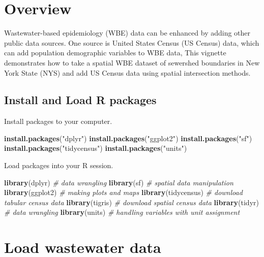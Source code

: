 \documentclass[
]{book}
\newenvironment{Shaded}{\begin{snugshade}}{\end{snugshade}}
\newcommand{\CommentTok}[1]{\textcolor[rgb]{0.56,0.35,0.01}{\textit{#1}}}
\newcommand{\FunctionTok}[1]{\textcolor[rgb]{0.13,0.29,0.53}{\textbf{#1}}}
\newcommand{\NormalTok}[1]{#1}
\newcommand{\StringTok}[1]{\textcolor[rgb]{0.31,0.60,0.02}{#1}}
\begin{document}
\section{Overview}\label{overview-1}

Wastewater-based epidemiology (WBE) data can be enhanced by adding other public data sources. One source is United States Census (US Census) data, which can add population demographic variables to WBE data, This vignette demonstrates how to take a spatial WBE dataset of sewershed boundaries in New York State (NYS) and add US Census data using spatial intersection methods.

\subsection{Install and Load R packages}\label{install-and-load-r-packages}

Install packages to your computer.

\begin{Shaded}
\begin{Highlighting}[]
\FunctionTok{install.packages}\NormalTok{(}\StringTok{"dplyr"}\NormalTok{)}
\FunctionTok{install.packages}\NormalTok{(}\StringTok{"ggplot2"}\NormalTok{)}
\FunctionTok{install.packages}\NormalTok{(}\StringTok{"sf"}\NormalTok{)}
\FunctionTok{install.packages}\NormalTok{(}\StringTok{"tidycensus"}\NormalTok{)}
\FunctionTok{install.packages}\NormalTok{(}\StringTok{"units"}\NormalTok{)}
\end{Highlighting}
\end{Shaded}

Load packages into your R session.

\begin{Shaded}
\begin{Highlighting}[]
\FunctionTok{library}\NormalTok{(dplyr) }\CommentTok{\# data wrangling}
\FunctionTok{library}\NormalTok{(sf) }\CommentTok{\# spatial data manipulation}
\FunctionTok{library}\NormalTok{(ggplot2) }\CommentTok{\# making plots and maps}
\FunctionTok{library}\NormalTok{(tidycensus) }\CommentTok{\# download tabular census data}
\FunctionTok{library}\NormalTok{(tigris) }\CommentTok{\# download spatial census data}
\FunctionTok{library}\NormalTok{(tidyr) }\CommentTok{\# data wrangling}
\FunctionTok{library}\NormalTok{(units) }\CommentTok{\# handling variables with unit assignment}
\end{Highlighting}
\end{Shaded}

\section{Load wastewater data}\label{load-wastewater-data}
\end{document}
